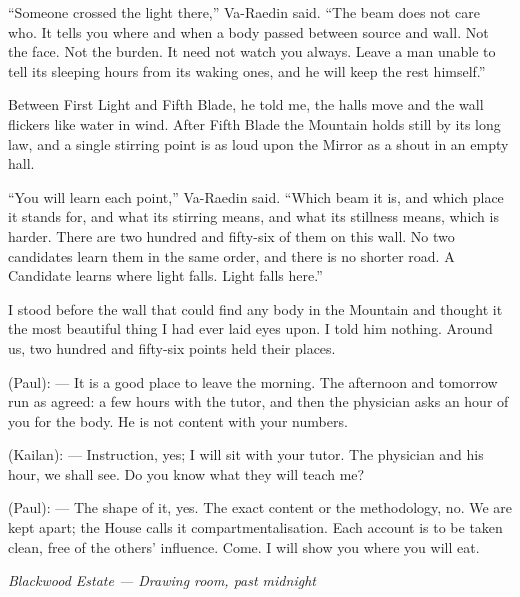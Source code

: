 ``Someone crossed the light there,'' Va-Raedin said. ``The beam does not care who. It tells you where and when a body passed between source and wall. Not the face. Not the burden. It need not watch you always. Leave a man unable to tell its sleeping hours from its waking ones, and he will keep the rest himself.''\par

Between First Light and Fifth Blade, he told me, the halls move and the wall flickers like water in wind. After Fifth Blade the Mountain holds still by its long law, and a single stirring point is as loud upon the Mirror as a shout in an empty hall.\par

``You will learn each point,'' Va-Raedin said. ``Which beam it is, and which place it stands for, and what its stirring means, and what its stillness means, which is harder. 
There are two hundred and fifty-six of them on this wall. No two candidates learn them in the same order, and there is no shorter road. A Candidate learns where light falls. Light falls here.''\par

I stood before the wall that could find any body in the Mountain and thought it the most beautiful thing I had ever laid eyes upon. I told him nothing. Around us, two hundred and fifty-six points held their places.\par

\begin{room}

(Paul): --- It is a good place to leave the morning. The afternoon and tomorrow run as agreed: a few hours with the tutor, and then the physician asks an hour of you for the body. He is not content with your numbers.

(Kailan): --- Instruction, yes; I will sit with your tutor. The physician and his hour, we shall see. Do you know what they will teach me?

(Paul): --- The shape of it, yes. The exact content or the methodology, no. We are kept apart; the House calls it compartmentalisation. Each account is to be taken clean, free of the others' influence. Come. I will show you where you will eat.

\end{room}

\begin{center}\small\itshape Blackwood Estate --- Drawing room, past midnight\end{center}

